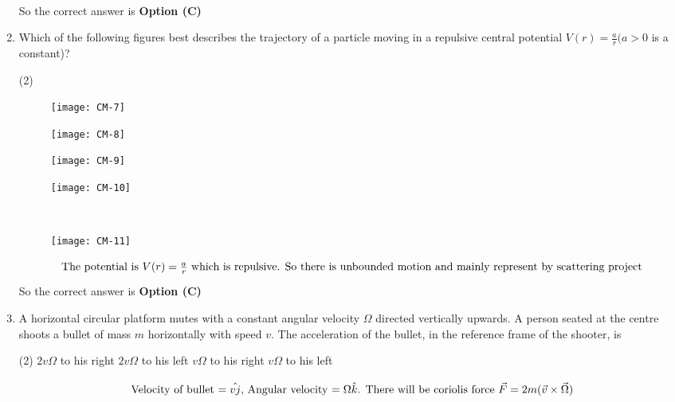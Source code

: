 \begin{enumerate}
\begin{answer}
\begin{align*}
\end{align*}
So the correct answer is \textbf{Option (C)}
\end{answer}
	\item Which of the following figures best describes the trajectory of a particle moving in a repulsive central potential $V(r)=\frac{a}{r}(a>0$ is a constant)?
{	}
\begin{tasks}(2)
\task[\textbf{A.}] \begin{figure}[H]
	\centering
	\texttt{[image: CM-7]}
\end{figure}
\task[\textbf{B.}] \begin{figure}[H]
	\centering
	\texttt{[image: CM-8]}
\end{figure}
\task[\textbf{C.}] \begin{figure}[H]
	\centering
	\texttt{[image: CM-9]}
\end{figure}
\task[\textbf{D.}] \begin{figure}[H]
	\centering
	\texttt{[image: CM-10]}
\end{figure}
\end{tasks}
\begin{answer}$\left. \right. $
\begin{figure}[H]
	\centering
	\texttt{[image: CM-11]}
\end{figure}
\begin{align*}
\intertext{The potential is $V(r)=\frac{a}{r}$ which is repulsive. So there is unbounded motion and mainly represent by scattering project}
\end{align*}
So the correct answer is \textbf{Option (C)}
\end{answer}
	\item A horizontal circular platform mutes with a constant angular velocity $\Omega$ directed vertically upwards. A person seated at the centre shoots a bullet of mass $m$ horizontally with speed $v$. The acceleration of the bullet, in the reference frame of the shooter, is
{	}
\begin{tasks}(2)
\task[\textbf{A.}]  $2 v \Omega$ to his right
\task[\textbf{B.}] $2 v \Omega$ to his left
\task[\textbf{C.}] $v \Omega$ to his right
\task[\textbf{D.}] $v \Omega$ to his left
\end{tasks}
\begin{answer}
\begin{align*}
\intertext{Velocity of bullet $=\hat{v j}$, Angular velocity $=\Omega \hat{k}$. There will be coriolis force $\vec{F}=2 m(\vec{v} \times \vec{\Omega})$}

\end{align*}
\end{answer}
\end{enumerate}
